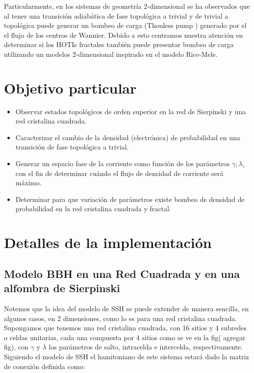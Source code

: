 Particularmente, en los sistemas de geometría 2-dimensional se ha observados que al tener una transición adiabática de fase topológica a trivial y de trivial a topológica puede generar un bombeo de carga (Thouless pump \cite{benalcazar2020higher}) generado por el el flujo de los centros de Wannier. Debido a esto centramos nuestra atención en determinar si los HOTIs fractales también puede presentar bombeo de carga utilizando un modelos 2-dimensional inspirado en el modelo Rice-Mele.
    
    \section{Objetivo particular}
    \begin{itemize}
        \item Observar estados topológicos de orden superior en la red de Sierpinski y una red cristalina cuadrada.
        \item Caracterizar el cambio de la densidad (electrónica) de probabilidad en una transición de fase topológica a trivial. 
        \item Generar un espacio fase de la corriente como función de los parámetros $\gamma, \lambda$, con el fin de determinar cuándo el flujo de densidad de corriente será máximo.
        \item Determinar para que variación de parámetros existe bombeo de densidad de probabilidad en la red cristalina cuadrada y fractal.
    \end{itemize}
    
\section{Detalles de la implementación}
    

\subsection{Modelo BBH en una Red Cuadrada y en una alfombra de Sierpinski}\label{Modelo_SSH_squara_and_Fractal}

    Notemos que la idea del modelo de SSH se puede extender de manera sencilla, en algunos casos, en 2 dimensiones, como lo es para una red cristalina cuadrada. Supongamos que tenemos una red cristalina cuadrada, con 16 sitios y 4 subredes o celdas unitarias, cada una compuesta por 4 sitios como se ve en la fig( agregar fig), con $\gamma$ y $\lambda$ los parámetros de salto, intracelda e intercelda, respectivamente. Siguiendo el modelo de SSH el hamitoniano de este sistema estará dado la matriz de conexión definida como: 
    

